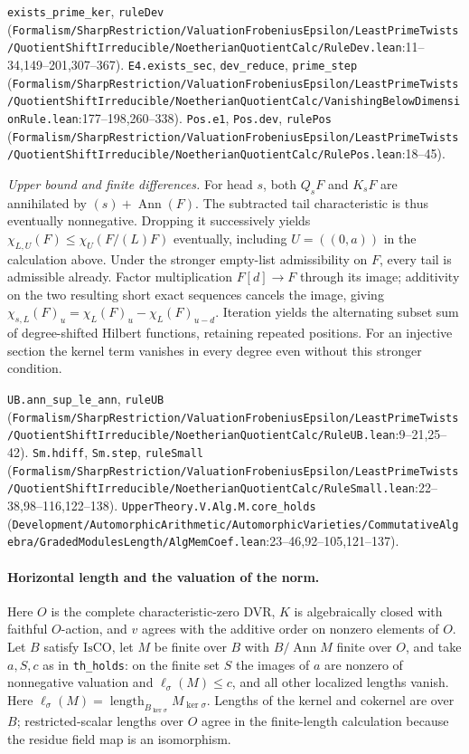 {\footnotesize \nolinkurl{exists_prime_ker}, \nolinkurl{ruleDev} (\nolinkurl{Formalism/SharpRestriction/ValuationFrobeniusEpsilon/LeastPrimeTwists/QuotientShiftIrreducible/NoetherianQuotientCalc/RuleDev.lean}\allowbreak:11--34,149--201,307--367). \nolinkurl{E4.exists_sec}, \nolinkurl{dev_reduce}, \nolinkurl{prime_step} (\nolinkurl{Formalism/SharpRestriction/ValuationFrobeniusEpsilon/LeastPrimeTwists/QuotientShiftIrreducible/NoetherianQuotientCalc/VanishingBelowDimensionRule.lean}\allowbreak:177--198,260--338). \nolinkurl{Pos.e1}, \nolinkurl{Pos.dev}, \nolinkurl{rulePos} (\nolinkurl{Formalism/SharpRestriction/ValuationFrobeniusEpsilon/LeastPrimeTwists/QuotientShiftIrreducible/NoetherianQuotientCalc/RulePos.lean}\allowbreak:18--45).}

\emph{Upper bound and finite differences.} For head $s$, both $Q_sF$ and $K_sF$ are annihilated by $(s)+\operatorname{Ann}(F)$. The subtracted tail characteristic is thus eventually nonnegative. Dropping it successively yields $\chi_{L,U}(F)\le\chi_U(F/(L)F)$ eventually, including $U=((0,a))$ in the calculation above. Under the stronger empty-list admissibility on $F$, every tail is admissible already. Factor multiplication $F[d]\to F$ through its image; additivity on the two resulting short exact sequences cancels the image, giving $\chi_{s,L}(F)_u=\chi_L(F)_u-\chi_L(F)_{u-d}$. Iteration yields the alternating subset sum of degree-shifted Hilbert functions, retaining repeated positions. For an injective section the kernel term vanishes in every degree even without this stronger condition.

{\footnotesize \nolinkurl{UB.ann_sup_le_ann}, \nolinkurl{ruleUB} (\nolinkurl{Formalism/SharpRestriction/ValuationFrobeniusEpsilon/LeastPrimeTwists/QuotientShiftIrreducible/NoetherianQuotientCalc/RuleUB.lean}\allowbreak:9--21,25--42). \nolinkurl{Sm.hdiff}, \nolinkurl{Sm.step}, \nolinkurl{ruleSmall} (\nolinkurl{Formalism/SharpRestriction/ValuationFrobeniusEpsilon/LeastPrimeTwists/QuotientShiftIrreducible/NoetherianQuotientCalc/RuleSmall.lean}\allowbreak:22--38,98--116,122--138). \nolinkurl{UpperTheory.V.Alg.M.core_holds} (\nolinkurl{Development/AutomorphicArithmetic/AutomorphicVarieties/CommutativeAlgebra/GradedModulesLength/AlgMemCoef.lean}\allowbreak:23--46,92--105,121--137).}

\paragraph{Horizontal length and the valuation of the norm.}
Here $O$ is the complete characteristic-zero DVR, $K$ is algebraically closed with faithful $O$-action, and $v$ agrees with the additive order on nonzero elements of $O$. Let $B$ satisfy $\mathrm{IsCO}$, let $M$ be finite over $B$ with $B/\operatorname{Ann} M$ finite over $O$, and take $a,S,c$ as in \nolinkurl{th_holds}: on the finite set $S$ the images of $a$ are nonzero of nonnegative valuation and $\ell_\sigma(M)\le c$, and all other localized lengths vanish. Here $\ell_\sigma(M)=\operatorname{length}_{B_{\ker\sigma}}M_{\ker\sigma}$. Lengths of the kernel and cokernel are over $B$; restricted-scalar lengths over $O$ agree in the finite-length calculation because the residue field map is an isomorphism.

